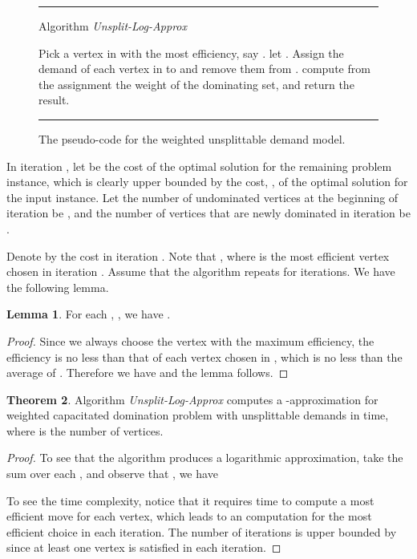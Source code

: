\documentclass[a4paper,11pt]{article}
\theoremstyle{definition}
\newtheorem{theorem}{Theorem}
\newtheorem{lemma}[theorem]{Lemma}
\begin{document}
\begin{figure*}[t]
\rule{\linewidth}{0.2mm}
\medskip
{{\sc Algorithm} {\em Unsplit-Log-Approx
}}

\begin{algorithmic}[1]
\STATE 
\WHILE{}
    \STATE Pick a vertex in  with the most efficiency, say .
    \STATE let .
    \STATE Assign the demand of each vertex in  to  and remove them from .
\ENDWHILE
\STATE compute from the assignment the weight of the dominating set, and return the result.

\end{algorithmic}
\rule{\linewidth}{0.2mm} 
\caption{The pseudo-code for the 
weighted unsplittable demand model.} \label{Algorithm for
Weighted Unsplittable Demand}
\end{figure*}

In iteration , let  be the cost of the optimal solution
for the remaining problem instance, which is clearly upper bounded
by the cost, , of the optimal solution for the input instance.
Let the number of undominated vertices at the beginning of iteration  be
, and the number of vertices that are newly dominated in iteration  be .

\smallskip

Denote by  the cost in iteration . Note that , where  is the most efficient vertex chosen
in iteration . Assume that the algorithm repeats for 
iterations. 
We have the following lemma.

\begin{lemma} \label{lemma_greedy_weighted_unsplittable}
For each , , we have .
\end{lemma}

\begin{proof}
Since we always choose the vertex with the maximum 
efficiency, the efficiency is no less than that of each vertex
chosen in , which is no less than the average of . Therefore we have
 and the lemma follows.
\end{proof}

\smallskip

\begin{theorem} \label{theorem_weighted_unsplittable_logn}
Algorithm {\em Unsplit-Log-Approx} computes a -approximation for weighted capacitated domination problem with unsplittable demands in  time, where  is the number of vertices.
\end{theorem}

\begin{proof}
To see that the algorithm produces a logarithmic approximation, take
the sum over each ,  and observe that , we have

To see the time complexity, notice that it requires  time to compute a most efficient move for each vertex, which leads to an  computation for the most efficient choice in each iteration. The number of iterations is upper bounded by  since at least one vertex is satisfied in each iteration.
\end{proof}
\end{document}
